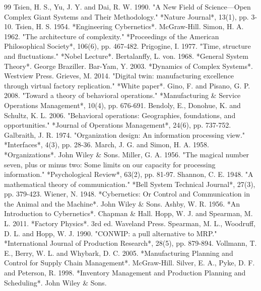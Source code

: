 \documentclass[11pt,a4paper]{article}
\begin{document}

\begin{thebibliography}{99}
 Tsien, H. S., Yu, J. Y. and Dai, R. W. 1990. "A New Field of Science—Open Complex Giant Systems and Their Methodology." *Nature Journal*, 13(1), pp. 3-10.
 Tsien, H. S. 1954. *Engineering Cybernetics*. McGraw-Hill.
 Simon, H. A. 1962. "The architecture of complexity." *Proceedings of the American Philosophical Society*, 106(6), pp. 467-482.
 Prigogine, I. 1977. "Time, structure and fluctuations." *Nobel Lecture*.
 Bertalanffy, L. von. 1968. *General System Theory*. George Braziller.
 Bar-Yam, Y. 2003. *Dynamics of Complex Systems*. Westview Press.
 Grieves, M. 2014. "Digital twin: manufacturing excellence through virtual factory replication." *White paper*.
 Gino, F. and Pisano, G. P. 2008. "Toward a theory of behavioral operations." *Manufacturing \& Service Operations Management*, 10(4), pp. 676-691.
 Bendoly, E., Donohue, K. and Schultz, K. L. 2006. "Behavioral operations: Geographies, foundations, and opportunities." *Journal of Operations Management*, 24(6), pp. 737-752.
 Galbraith, J. R. 1974. "Organization design: An information processing view." *Interfaces*, 4(3), pp. 28-36.
 March, J. G. and Simon, H. A. 1958. *Organizations*. John Wiley \& Sons.
 Miller, G. A. 1956. "The magical number seven, plus or minus two: Some limits on our capacity for processing information." *Psychological Review*, 63(2), pp. 81-97.
 Shannon, C. E. 1948. "A mathematical theory of communication." *Bell System Technical Journal*, 27(3), pp. 379-423.
 Wiener, N. 1948. *Cybernetics: Or Control and Communication in the Animal and the Machine*. John Wiley \& Sons.
 Ashby, W. R. 1956. *An Introduction to Cybernetics*. Chapman \& Hall.
 Hopp, W. J. and Spearman, M. L. 2011. *Factory Physics*. 3rd ed. Waveland Press.
 Spearman, M. L., Woodruff, D. L. and Hopp, W. J. 1990. "CONWIP: a pull alternative to MRP." *International Journal of Production Research*, 28(5), pp. 879-894.
 Vollmann, T. E., Berry, W. L. and Whybark, D. C. 2005. *Manufacturing Planning and Control for Supply Chain Management*. McGraw-Hill.
 Silver, E. A., Pyke, D. F. and Peterson, R. 1998. *Inventory Management and Production Planning and Scheduling*. John Wiley \& Sons.

\end{thebibliography}
\end{document}
